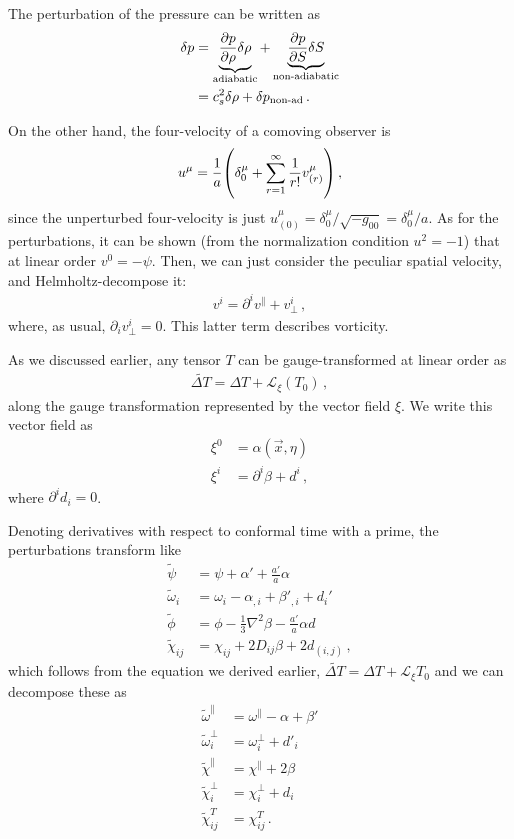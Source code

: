 \documentclass[main.tex]{subfiles}
\begin{document}
The perturbation of the pressure can be written as 
%
\begin{align}
\delta p &= \underbrace{\pdv{p}{\rho } \delta \rho }_{\text{adiabatic}} 
+ \underbrace{\pdv{p}{S} \delta S}_{\text{non-adiabatic}}  \\
&= c_s^2 \delta \rho + \delta p _{\text{non-ad}}
\,.
\end{align}

On the other hand, the four-velocity of a comoving observer is 
%
\begin{align}
u^{\mu } = \frac{1}{a} \qty(\delta^{\mu }_{0} + \sum _{r=1}^{\infty } \frac{1}{r!} v^{\mu }_{(r)})
\,,
\end{align}
%
since the unperturbed four-velocity is just \(u^{\mu }_{(0)} = \delta^{\mu }_0  / \sqrt{- g_{00} } = \delta^{\mu }_{0} / a\).
As for the perturbations, it can be shown (from the normalization condition \(u^2= -1\)) that at linear order \(v^{0} = - \psi \). 
Then, we can just consider the peculiar spatial velocity, and Helmholtz-decompose it: 
%
\begin{align}
v^{i} = \partial^{i} v^{\parallel} + v^{i}_\perp
\,,
\end{align}
%
where, as usual, \(\partial_{i} v^{i}_\perp = 0\). 
This latter term describes vorticity. 

As we discussed earlier, any tensor \(T\) can be gauge-transformed at linear order as 
%
\begin{align}
\widetilde{\Delta T} = \Delta T + \mathscr{L}_\xi (T_0 )
\,,
\end{align}
%
along the gauge transformation represented by the vector field \(\xi \). 
We write this vector field as 
%
\begin{align}
\xi^{0} &= \alpha (\vec{x}, \eta )  \\
\xi^{i} &= \partial^{i} \beta + d^{i}
\,,
\end{align}
%
where \(\partial^{i} d_i = 0\). 

Denoting derivatives with respect to conformal time with a prime, the perturbations transform like 
%
\begin{align}
\widetilde{\psi} &= \psi + \alpha ' + \frac{a'}{a} \alpha   \\
\widetilde{\omega}_i &= \omega _i - \alpha_{, i} + \beta'_{, i} + d _i'   \\ 
\widetilde{\phi} &= \phi - \frac{1}{3} \nabla^2 \beta - \frac{a'}{a} \alpha d \\
\widetilde{\chi}_{ij} &= \chi_{ij} + 2 D_{ij} \beta + 2d_{(i, j)} 
\,,
\end{align}
%
which follows from the equation we derived earlier, \(\widetilde{\Delta T}  = \Delta T + \mathscr{L}_\xi T_0  \)
and we can decompose these as 
%
\begin{align}
\widetilde{\omega}^{\parallel} &= \omega^{\parallel} - \alpha + \beta '  \\
\widetilde{\omega}^{\perp}_i &= \omega^{\perp}_i + d'_i  \\
\widetilde{\chi}^{\parallel } &= \chi^{\parallel} + 2 \beta   \\
\widetilde{\chi}^{\perp}_i &= \chi^{\perp}_i + d _i  \\
\widetilde{\chi}^{T}_{ij} &= \chi^{T}_{ij}
\,.
\end{align}
\end{document}
